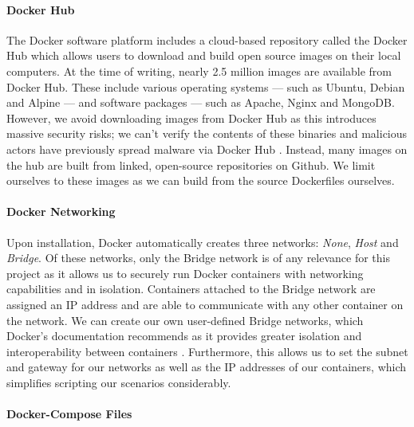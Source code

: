 \documentclass[msc,deptreport, cs]{infthesis} %
\begin{document}
\paragraph*{Docker Hub}
   The Docker software platform includes a cloud-based repository called the Docker Hub \cite{dockerhub} which allows users to download and build open source images on their local computers. At the time of writing, nearly 2.5 million images are available from Docker Hub. These include various operating systems --- such as Ubuntu,  Debian and Alpine --- and software packages --- such as Apache, Nginx and MongoDB. However, we avoid downloading images from Docker Hub as this introduces massive security risks; we can't verify the contents of these binaries and malicious actors have previously spread malware via Docker Hub \cite{dockermalware}. Instead, many images on the hub are built from linked, open-source repositories on Github. We limit ourselves to these images as we can build from the source Dockerfiles ourselves.

\paragraph*{Docker Networking} Upon installation, Docker automatically creates three networks: \textit{None}, \textit{Host} and \textit{Bridge}. Of these networks, only the Bridge network is of any relevance for this project as it allows us to securely run Docker containers with networking capabilities and in isolation. Containers attached to the Bridge network are assigned an IP address and are able to communicate with any other container on the network. We can create our own user-defined Bridge networks, which Docker's documentation recommends as it provides greater isolation and interoperability between containers \cite{docker_docs}. Furthermore, this allows us to set the subnet and gateway for our networks as well as the IP addresses of our containers, which simplifies scripting our scenarios considerably.


\paragraph*{Docker-Compose Files}
\end{document}
